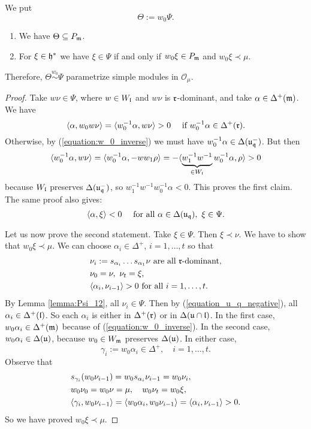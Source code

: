 \documentclass[a4paper,10pt]{article}
\begin{document}
We put
%
\[ \Theta := w_0 \Psi. \]
%
\begin{lemma}
\begin{enumerate}
\item We have $\Theta \subseteq P_{\mathfrak{m}}$.

\item For $\xi \in \mathfrak{h}^\ast$ we have $\xi \in \Psi$ if and only if $w_0 \xi \in P_{\mathfrak{m}}$ and $w_0 \xi \prec \mu$.

\end{enumerate}

Therefore, $\Theta \stackrel{w_0}{\sim} \Psi$ parametrize simple modules in $\mathcal{O}_\mu$.
\end{lemma}
%
\begin{proof}
Take $w \nu \in \Psi$, where $w \in W_{\mathfrak{l}}$ and $w \nu$ is $\mathfrak{r}$-dominant, and take $\alpha \in \Delta^+(\mathfrak{m})$. We have
%
\[ \langle \alpha, w_0 w \nu \rangle = \langle w_0^{-1}\alpha, w \nu \rangle > 0 \quad \text{ if $w_0^{-1}\alpha \in \Delta^+(\mathfrak{r})$.} \]
%
Otherwise, by (\ref{equation:w_0_inverse}) we must have $w_0^{-1}\alpha \in \Delta(\mathfrak{u_q^-})$. But then
%
\[\langle w_0^{-1}\alpha, w \nu \rangle = \langle w_0^{-1}\alpha, - ww_1 \rho \rangle = -\langle \underbrace{w_1^{-1}w^{-1}}_{\in W_{\mathfrak{l}}}w_0^{-1}\alpha, \rho \rangle >0  \]
%
because $W_{\mathfrak{l}}$ preserves $\Delta(\mathfrak{u_q^-})$, so $w_1^{-1}w^{-1}w_0^{-1}\alpha<0$. This proves the first claim. The same proof also gives:
%
\begin{equation}
\label{equation_u_q_negative}
\langle \alpha, \xi \rangle < 0 \quad \text{ for all } \alpha \in \Delta(\mathfrak{u_q}), \ \xi \in \Psi.
\end{equation}

Let us now prove the second statement. Take $\xi \in \Psi$. Then $\xi \prec \nu$. We have to show that $w_0 \xi \prec \mu$. We can choose $\alpha_i \in \Delta^+$, $i=1,\ldots,t$ so that
%
\begin{align*} & \nu_i:= s_{\alpha_i} \ldots s_{\alpha_1} \nu \text{ are all $\mathfrak{r}$-dominant}, \\
& \nu_0=\nu, \ \nu_t=\xi, \\
& \langle \alpha_i, \nu_{i-1} \rangle>0 \text{ for all $i=1,\ldots,t$}.
\end{align*}
%
By Lemma \ref{lemma:Psi_12}, all $\nu_i \in \Psi$. Then by (\ref{equation_u_q_negative}), all $\alpha_i \in \Delta^+(\mathfrak{l})$. So each $\alpha_i$ is either in $\Delta^+(\mathfrak{r})$ or in $\Delta(\mathfrak{u \cap l})$. In the first case, $w_0 \alpha_i \in \Delta^+(\mathfrak{m})$ because of (\ref{equation:w_0_inverse}). In the second case, $w_0 \alpha_i \in \Delta(\mathfrak{u})$, because $w_0 \in W_{\mathfrak{m}}$ preserves $\Delta(\mathfrak{u})$. In either case,
%
\[ \gamma_i:= w_0 \alpha_i \in \Delta^+, \quad i=1, \ldots, t. \]
%
Observe that
%
\begin{align*} & s_{\gamma_i} (w_0 \nu_{i-1}) = w_0 s_{\alpha_i} \nu_{i-1} = w_0 \nu_i , \\
& w_0 \nu_0 = w_0 \nu = \mu, \quad w_0 \nu_t =  w_0 \xi, \\
& \langle \gamma_i, w_0 \nu_{i-1} \rangle = \langle w_0 \alpha_i, w_0 \nu_{i-1} \rangle = \langle \alpha_i, \nu_{i-1} \rangle >0.
\end{align*}
%
So we have proved $w_0 \xi \prec \mu$.


\end{proof}
\end{document}
